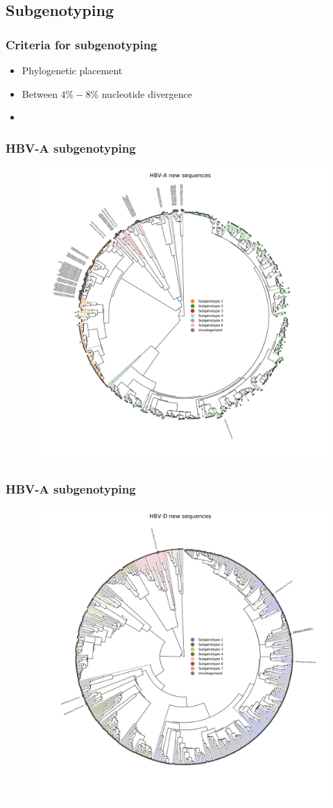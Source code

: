 \documentclass{beamer}
\begin{document}
\subsection{Subgenotyping}

\begin{frame}
  \frametitle{Criteria for subgenotyping}
  \begin{itemize}
    \item Phylogenetic placement
    \item Between $4\%-8\%$ nucleotide divergence
    \item
  \end{itemize}
\end{frame}


\begin{frame}
  \frametitle{HBV-A subgenotyping}
  \begin{figure}
    \includegraphics[width=.6\linewidth]{image/results/HBV-A_new_sequences}
  \end{figure}
\end{frame}


\begin{frame}
  \frametitle{HBV-A subgenotyping}
  \begin{figure}
    \includegraphics[width=.6\linewidth]{image/results/HBV-D_new_sequences}
  \end{figure}
\end{frame}
\end{document}
